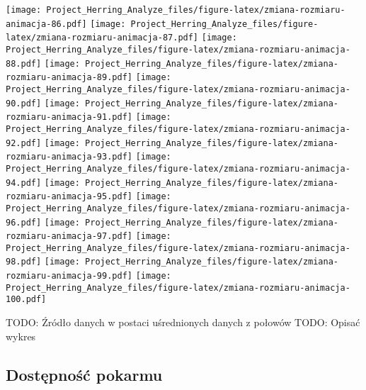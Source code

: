 \documentclass[]{article}
\begin{document}
\texttt{[image: Project\_Herring\_Analyze\_files/figure-latex/zmiana-rozmiaru-animacja-86.pdf]}
\texttt{[image: Project\_Herring\_Analyze\_files/figure-latex/zmiana-rozmiaru-animacja-87.pdf]}
\texttt{[image: Project\_Herring\_Analyze\_files/figure-latex/zmiana-rozmiaru-animacja-88.pdf]}
\texttt{[image: Project\_Herring\_Analyze\_files/figure-latex/zmiana-rozmiaru-animacja-89.pdf]}
\texttt{[image: Project\_Herring\_Analyze\_files/figure-latex/zmiana-rozmiaru-animacja-90.pdf]}
\texttt{[image: Project\_Herring\_Analyze\_files/figure-latex/zmiana-rozmiaru-animacja-91.pdf]}
\texttt{[image: Project\_Herring\_Analyze\_files/figure-latex/zmiana-rozmiaru-animacja-92.pdf]}
\texttt{[image: Project\_Herring\_Analyze\_files/figure-latex/zmiana-rozmiaru-animacja-93.pdf]}
\texttt{[image: Project\_Herring\_Analyze\_files/figure-latex/zmiana-rozmiaru-animacja-94.pdf]}
\texttt{[image: Project\_Herring\_Analyze\_files/figure-latex/zmiana-rozmiaru-animacja-95.pdf]}
\texttt{[image: Project\_Herring\_Analyze\_files/figure-latex/zmiana-rozmiaru-animacja-96.pdf]}
\texttt{[image: Project\_Herring\_Analyze\_files/figure-latex/zmiana-rozmiaru-animacja-97.pdf]}
\texttt{[image: Project\_Herring\_Analyze\_files/figure-latex/zmiana-rozmiaru-animacja-98.pdf]}
\texttt{[image: Project\_Herring\_Analyze\_files/figure-latex/zmiana-rozmiaru-animacja-99.pdf]}
\texttt{[image: Project\_Herring\_Analyze\_files/figure-latex/zmiana-rozmiaru-animacja-100.pdf]}

TODO: Źródło danych w postaci uśrednionych danych z połowów TODO: Opisać
wykres

\hypertarget{dostux119pnoux15bux107-pokarmu}{%
\subsection{Dostępność pokarmu}\label{dostux119pnoux15bux107-pokarmu}}
\end{document}
